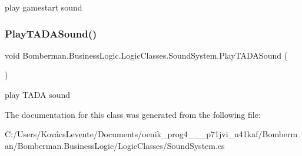play gamestart sound 

\mbox{\label{class_bomberman_1_1_business_logic_1_1_logic_classes_1_1_sound_system_a754b631c572e32c773c22ddb8ff12fcb}} 
\subsubsection{\texorpdfstring{PlayTADASound()}{PlayTADASound()}}
{\footnotesize\ttfamily void Bomberman.\+Business\+Logic.\+Logic\+Classes.\+Sound\+System.\+Play\+T\+A\+D\+A\+Sound (\begin{DoxyParamCaption}{ }\end{DoxyParamCaption})\hspace{0.3cm}{\ttfamily [inline]}}



play T\+A\+DA sound 



The documentation for this class was generated from the following file\+:\begin{DoxyCompactItemize}
\item 
C\+:/\+Users/\+Kovács\+Levente/\+Documents/oenik\+\_\+prog4\+\_\+\_\+\_\+p71jvi\+\_\+u41kaf/\+Bomberman/\+Bomberman.\+Business\+Logic/\+Logic\+Classes/Sound\+System.\+cs\end{DoxyCompactItemize}
